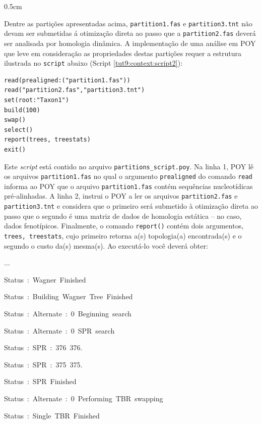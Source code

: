 \begin{refsection}
\begin {myindentpar}{0.5cm}
\begin{enumerate}[\itshape 1.]
\end{enumerate}
\end{myindentpar}

Dentre as partições apresentadas acima, \texttt{partition1.fas} e \texttt{partition3.tnt} não devam ser submetidas á otimização direta ao passo que a \texttt{partition2.fas} deverá ser analisada por homologia dinâmica. A implementação de uma análise em POY que leve em consideração as propriedades destas partições requer a estrutura ilustrada no \texttt{script} abaixo (Script \ref{tut9:context:script2}):\\


\begin{lstlisting}[caption= conteúdo do arquivo partitions\_script.poy,label=tut9:context:script2]
read(prealigned:("partition1.fas"))
read("partition2.fas","partition3.tnt")
set(root:"Taxon1")
build(100)
swap()
select()
report(trees, treestats)
exit()
\end{lstlisting}

Este \textit{script} está contido no arquivo \texttt{partitions\_script.poy}. Na linha 1, POY lê os arquivos \texttt{partition1.fas} no qual o argumento \texttt{prealigned} do comando \texttt{read} informa ao POY que o arquivo \texttt{partition1.fas} contém sequências nucleotídicas pré-alinhadas. A linha 2, instrui o POY a ler os arquivos \texttt{partition2.fas}  e \texttt{partition3.tnt} e considera que o primeiro será submetido à otimização direta ao passo que o segundo é uma matriz de dados de homologia estática -- no caso, dados fenotípicos. Finalmente, o comando \texttt{report()} contém dois argumentos, \texttt{trees, treestats}, cujo primeiro retorna a(s) topologia(a) encontrada(s) e o segundo o custo da(s) mesma(s). Ao executá-lo você deverá obter:\\

\scriptsize

...

Status~:~Wagner~Finished

Status~:~Building~Wagner~Tree~Finished

Status~:~Alternate~:~0~Beginning~search

Status~:~Alternate~:~0~SPR~search

Status~:~SPR~:~376~376.

Status~:~SPR~:~375~375.

Status~:~SPR~Finished

Status~:~Alternate~:~0~Performing~TBR~swapping

Status~:~Single~TBR~Finished


\end{refsection}
